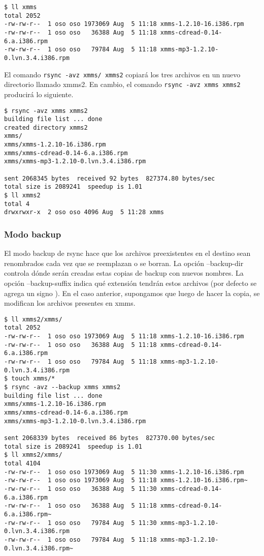 \begin{lstlisting}
$ ll xmms
total 2052
-rw-rw-r--  1 oso oso 1973069 Aug  5 11:18 xmms-1.2.10-16.i386.rpm
-rw-rw-r--  1 oso oso   36388 Aug  5 11:18 xmms-cdread-0.14-6.a.i386.rpm
-rw-rw-r--  1 oso oso   79784 Aug  5 11:18 xmms-mp3-1.2.10-0.lvn.3.4.i386.rpm
\end{lstlisting}

El comando \lstinline$rsync -avz xmms/ xmms2$ copiará los tres archivos en un nuevo directorio llamado xmms2. En cambio, el comando \lstinline$rsync -avz xmms xmms2$ producirá lo siguiente.

\begin{lstlisting}
$ rsync -avz xmms xmms2
building file list ... done
created directory xmms2
xmms/
xmms/xmms-1.2.10-16.i386.rpm
xmms/xmms-cdread-0.14-6.a.i386.rpm
xmms/xmms-mp3-1.2.10-0.lvn.3.4.i386.rpm

sent 2068345 bytes  received 92 bytes  827374.80 bytes/sec
total size is 2089241  speedup is 1.01
$ ll xmms2
total 4
drwxrwxr-x  2 oso oso 4096 Aug  5 11:28 xmms
\end{lstlisting}

\subsubsection{Modo backup}
El modo backup de rsync hace que los archivos preexistentes en el destino sean renombrados cada vez que se reemplazan o se borran. La opción --backup-dir controla dónde serán creadas estas copias de backup con nuevos nombres. La opción --backup-suffix indica qué extensión tendrán estos archivos (por defecto se agrega un signo \quotes{\textasciitilde}).
En el caso anterior, supongamos que luego de hacer la copia, se modifican los archivos presentes en xmms.

\begin{lstlisting}
$ ll xmms2/xmms/
total 2052
-rw-rw-r--  1 oso oso 1973069 Aug  5 11:18 xmms-1.2.10-16.i386.rpm
-rw-rw-r--  1 oso oso   36388 Aug  5 11:18 xmms-cdread-0.14-6.a.i386.rpm
-rw-rw-r--  1 oso oso   79784 Aug  5 11:18 xmms-mp3-1.2.10-0.lvn.3.4.i386.rpm
$ touch xmms/*
$ rsync -avz --backup xmms xmms2
building file list ... done
xmms/xmms-1.2.10-16.i386.rpm
xmms/xmms-cdread-0.14-6.a.i386.rpm
xmms/xmms-mp3-1.2.10-0.lvn.3.4.i386.rpm

sent 2068339 bytes  received 86 bytes  827370.00 bytes/sec
total size is 2089241  speedup is 1.01
$ ll xmms2/xmms/
total 4104
-rw-rw-r--  1 oso oso 1973069 Aug  5 11:30 xmms-1.2.10-16.i386.rpm
-rw-rw-r--  1 oso oso 1973069 Aug  5 11:18 xmms-1.2.10-16.i386.rpm~
-rw-rw-r--  1 oso oso   36388 Aug  5 11:30 xmms-cdread-0.14-6.a.i386.rpm
-rw-rw-r--  1 oso oso   36388 Aug  5 11:18 xmms-cdread-0.14-6.a.i386.rpm~
-rw-rw-r--  1 oso oso   79784 Aug  5 11:30 xmms-mp3-1.2.10-0.lvn.3.4.i386.rpm
-rw-rw-r--  1 oso oso   79784 Aug  5 11:18 xmms-mp3-1.2.10-0.lvn.3.4.i386.rpm~
\end{lstlisting}


